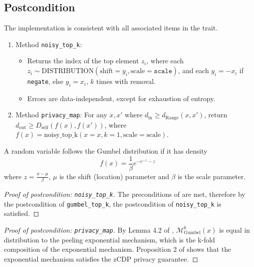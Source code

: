 \documentclass{article}
\begin{document}
\subsection*{Postcondition} 
\begin{theorem}
    The implementation is consistent with all associated items in the  trait.
    \begin{enumerate}
        \item Method \texttt{noisy\_top\_k}: 
        \begin{itemize}
            \item Returns the index of the top element $z_i$,
            where each $z_i \sim \mathrm{DISTRIBUTION}(\mathrm{shift}=y_i, \mathrm{scale}=\texttt{scale})$,
            and each $y_i = -x_i$ if \texttt{negate}, else $y_i = x_i$,
            $k$ times with removal.
            \item Errors are data-independent, except for exhaustion of entropy.
        \end{itemize}
        
        \item Method \texttt{privacy\_map}: 
        For any $x, x'$ where $d_\mathrm{in} \ge d_\mathrm{Range}(x, x')$,
        return $d_\mathrm{out} \ge D_\mathrm{self}(f(x), f(x'))$,
        where $f(x) = \mathrm{noisy\_top\_k}(x=x, k=1, \mathrm{scale}=\mathrm{scale})$.
    \end{enumerate}
\end{theorem}

\begin{definition}
    \label{def:Gumbel}
    A random variable follows the Gumbel distribution if it has density
    \begin{equation}
        f(x) = \frac{1}{\beta} e^{-e^{-z} - z}
    \end{equation}
    where $z = \frac{x - \mu}{\beta}$,
    $\mu$ is the shift (location) parameter and $\beta$ is the scale parameter.
\end{definition}

\begin{proof}[Proof of postcondition: \texttt{noisy\_top\_k}]
    The preconditions of  are met,
    therefore by the postcondition of \texttt{gumbel\_top\_k},
    the postcondition of \texttt{noisy\_top\_k} is satisfied.
\end{proof}

\begin{proof}[Proof of postcondition: \texttt{privacy\_map}]
    By Lemma 4.2 of \cite{Durfee2019PracticalDP}, $\mathcal{M}_{\mathrm{Gumbel}}^k(x)$ is equal in distribution to the peeling exponential mechanism,
    which is the k-fold composition of the exponential mechanism.
    Proposition 2 of \cite{Dong2019OptimalDP} shows that the exponential mechanism satisfies the zCDP privacy guarantee.
\end{proof}

 
 
\end{document}
